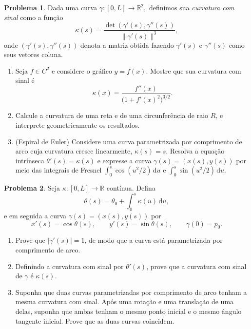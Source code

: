 \documentclass[10pt,a4paper]{amsart}
\newcommand{\R}{\mathbb{R}}
\renewcommand{\d}{\mathrm{d}}
\theoremstyle{definition}
\newtheorem{problema}{Problema}
\begin{document}
\begin{problema} Dada uma curva $\gamma:[0,L] \to \mathbb{R}^2,$ definimos sua \emph{curvatura com sinal} como a função 
\[
\kappa(s) = \frac{\det (\gamma'(s),\gamma''(s))}{\|\gamma'(s)\|^3},
\]
onde $(\gamma'(s),\gamma''(s))$ denota a matriz obtida fazendo $\gamma'(s) $ e $\gamma''(s)$ como seus vetores coluna. 
\begin{enumerate}[label=(\alph*)]
    \item Seja $f\in C^2$ e considere o gráfico $y=f(x)$. Mostre que sua
    curvatura com sinal é
    \[
        \kappa(x)=\frac{f''(x)}{\bigl(1+f'(x)^2\bigr)^{3/2}}.
    \]
    \item Calcule a curvatura de uma reta e de uma circunferência de raio
    $R$, e interprete geometricamente os resultados.
    \item (Espiral de Euler) Considere uma curva parametrizada por
    comprimento de arco cuja curvatura cresce linearmente, $\kappa(s)=s$.
    Resolva a equação intrínseca $\theta'(s)=\kappa(s)$ e expresse a curva
    $\gamma(s)=(x(s),y(s))$ por meio das integrais de Fresnel
    $\int_0^s\cos(u^2/2)\,\d u$ e $\int_0^s\sin(u^2/2)\,\d u$.
\end{enumerate}
\end{problema}

\begin{problema}
Seja $\kappa:[0,L]\to\R$ contínua. Defina
\[
    \theta(s)=\theta_0+\int_0^s \kappa(u)\,\d u,
\]
e em seguida a curva $\gamma(s)=(x(s),y(s))$ por
\[
    x'(s)=\cos\theta(s),
    \qquad
    y'(s)=\sin\theta(s),
    \qquad
    \gamma(0)=p_0.
\]
\begin{enumerate}[label=(\alph*)]
    \item Prove que $|\gamma'(s)|=1$, de modo que a curva está parametrizada
    por comprimento de arco.
    \item Definindo a curvatura com sinal por $\theta'(s)$, prove que a
    curvatura com sinal de $\gamma$ é $\kappa(s)$.
    \item Suponha que duas curvas parametrizadas por comprimento de arco
    tenham a mesma curvatura com sinal. Após uma rotação e uma translação de
    uma delas, suponha que ambas tenham o mesmo ponto inicial e o mesmo
    ângulo tangente inicial. Prove que as duas curvas coincidem.
\end{enumerate}
\end{problema}
\end{document}
